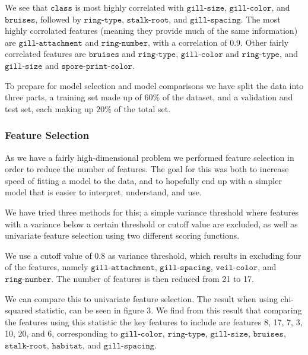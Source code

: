 \documentclass[11pt]{article}
\begin{document}
    We see that \(\texttt{class}\) is most highly correlated with
\(\texttt{gill-size}\), \(\texttt{gill-color}\), and
\(\texttt{bruises}\), followed by \(\texttt{ring-type}\),
\(\texttt{stalk-root}\), and \(\texttt{gill-spacing}\). The most highly
corrolated features (meaning they provide much of the same information)
are \(\texttt{gill-attachment}\) and \(\texttt{ring-number}\), with a
correlation of 0.9. Other fairly correlated features are
\(\texttt{bruises}\) and \(\texttt{ring-type}\), \(\texttt{gill-color}\)
and \(\texttt{ring-type}\), and \(\texttt{gill-size}\) and
\(\texttt{spore-print-color}\).

To prepare for model selection and model comparisons we have split the data into three parts, a training set made up of $60 \%$ of the dataset, and a validation and test set, each making up $20 \%$ of the total set.

    \hypertarget{feature-selection}{%
\subsubsection{Feature Selection}\label{feature-selection}}

As we have a fairly high-dimensional problem we performed feature
selection in order to reduce the number of features. The goal for this
was both to increase speed of fitting a model to the data, and to
hopefully end up with a simpler model that is easier to interpret,
understand, and use.

We have tried three methods for this; a simple variance threshold where
features with a variance below a certain threshold or cutoff value are
excluded, as well as univariate feature selection using two different
scoring functions.

We use a cutoff value of 0.8 as variance threshold, which results in
excluding four of the features, namely \(\texttt{gill-attachment}\),
\(\texttt{gill-spacing}\), \(\texttt{veil-color}\), and
\(\texttt{ring-number}\). The number of features is then reduced from 21
to 17.
        
 We can compare this to univariate feature selection. The result when using
chi-squared statistic, can be seen in figure 3. We find from this
result that comparing the features using this statistic the key features
to include are features 8, 17, 7, 3, 10, 20, and 6, corresponding to
\(\texttt{gill-color}\), \(\texttt{ring-type}\), \(\texttt{gill-size}\),
\(\texttt{bruises}\), \(\texttt{stalk-root}\), \(\texttt{habitat}\), and
\(\texttt{gill-spacing}\).
\end{document}
